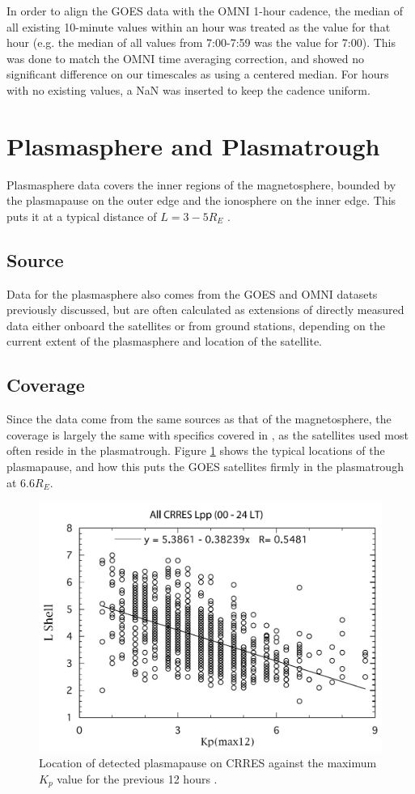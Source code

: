 In order to align the GOES data with the OMNI 1-hour cadence, the median of all existing 10-minute values within an hour was treated as the value for that hour (e.g. the median of all values from 7:00-7:59 was the value for 7:00). This was done to match the OMNI time averaging correction, and showed no significant difference on our timescales as using a centered median. For hours with no existing values, a NaN was inserted to keep the cadence uniform. 

\section{Plasmasphere and Plasmatrough}
Plasmasphere data covers the inner regions of the magnetosphere, bounded by the plasmapause on the outer edge and the ionosphere on the inner edge. This puts it at a typical distance of $L=3-5R_E$ \citep{Carpenter1992ISEEModel}. 

\subsection{Source}
Data for the plasmasphere also comes from the GOES and OMNI datasets previously discussed, but are often calculated as extensions of directly measured data either onboard the satellites or from ground stations, depending on the current extent of the plasmasphere and location of the satellite.

\subsection{Coverage}
Since the data come from the same sources as that of the magnetosphere, the coverage is largely the same with specifics covered in \cite{Takahashi2010SolarCycleVariation}, as the satellites used most often reside in the plasmatrough. Figure \ref{fig:PlasmatroughLocation} shows the typical locations of the plasmapause, and how this puts the GOES satellites firmly in the plasmatrough at 6.6$R_E$.

\begin{figure}[htp!]
	\centering
	\includegraphics[width=0.8\linewidth]{Figures/LShellPlasmapuse.png}
	\caption{Location of detected plasmapause on CRRES against the maximum $K_p$ value for the previous 12 hours \citep{Moldwin2002ModelPlasmapause}.}
	\label{fig:PlasmatroughLocation}
\end{figure}



